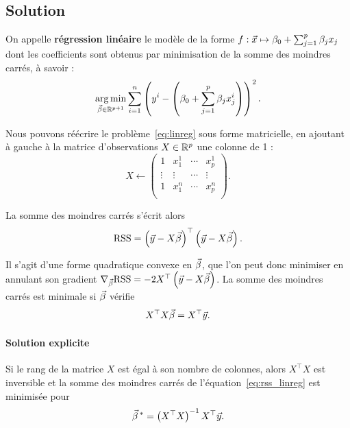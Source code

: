 \subsection{Solution}
On appelle \textbf{régression linéaire} le modèle de la forme
$f: \xx \mapsto \beta_0 + \sum_{j=1}^p \beta_j x_j$ dont les coefficients sont
obtenus par minimisation de la somme des moindres carrés, à savoir :
\begin{equation}
  \label{eq:linreg}
  \argmin_{\bbeta \in \RR^{p+1}}  \sum_{i=1}^n \left(y^i - \left(\beta_0 + 
      \sum_{j=1}^p \beta_j x^i_j \right)\right)^2.
\end{equation}
  
Nous pouvons réécrire le problème~\ref{eq:linreg} sous forme matricielle, en
ajoutant à gauche à la matrice d'observations $X \in \mathbb{R}^p$ une colonne de 1 :
\begin{equation}
  \label{eq:added_ones}
  X \leftarrow   \begin{pmatrix}
    1 & x_1^1 & \cdots & x_p^1 \\
    \vdots & \vdots & \cdots & \vdots \\
    1 & x_1^n& \cdots & x_p^n \\
  \end{pmatrix}.
\end{equation}

La somme des moindres carrés s'écrit alors
\begin{equation}
  \label{eq:rss_linreg}
  \text{RSS} = \left(\yy - X \bbeta\right)^\top \left(\yy -  X \bbeta\right).
\end{equation}

Il s'agit d'une forme quadratique convexe en $\bbeta$, que l'on peut donc
minimiser en annulant son gradient
$\nabla_{\bbeta} \text{RSS} = -2 X^\top \left(\yy - X \bbeta \right)$. La somme
des moindres carrés est minimale si $\bbeta$ vérifie 
\begin{equation}
  \label{eq:linreg_sol}
  X^\top X \bbeta = X^\top \yy.
\end{equation}
  
\paragraph{Solution explicite}
Si le rang de la matrice $X$ est égal à son nombre de colonnes, alors
$X^\top X$ est inversible et la somme des moindres carrés de
l'équation~\eqref{eq:rss_linreg} est minimisée pour
\begin{equation*}
  \bbeta^* = \left(X^\top X \right)^{-1} X^\top \yy.
\end{equation*}

